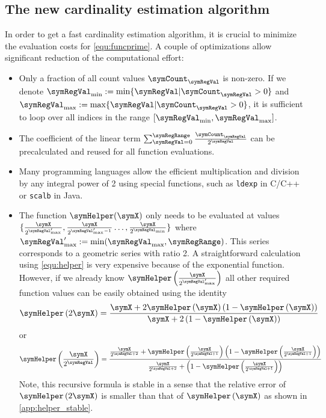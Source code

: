 \documentclass[11pt]{article} %
\begin{document}
\subsection{The new cardinality estimation algorithm}
In order to get a fast cardinality estimation algorithm, it is crucial to minimize the evaluation costs for \eqref{equ:funcprime}. A couple of optimizations allow significant reduction of the computational effort:
\begin{itemize}
\item Only a fraction of all count values $\symCount_\symRegVal$ is non-zero. If we denote $\symRegVal_\text{min}:=\min\lbrace \symRegVal\vert\symCount_\symRegVal>0\rbrace$ and $\symRegVal_\text{max}:=\max\lbrace \symRegVal\vert\symCount_\symRegVal>0\rbrace$,  it is sufficient to loop over all indices in the range $[\symRegVal_\text{min}, \symRegVal_\text{max}]$.
\item The coefficient of the linear term $\sum_{\symRegVal=0}^\symRegRange \frac{\symCount_\symRegVal}{2^\symRegVal}$ can be precalculated and reused for all function evaluations.
\item Many programming languages allow the efficient multiplication and division by any integral power of 2 using special functions, such as \texttt{ldexp} in C/C++ or \texttt{scalb} in Java.
\item The function $\symHelper(\symX)$ only needs to be evaluated at values $\lbrace\frac{\symX}{2^{\symRegVal'_\text{max}}},\frac{\symX}{2^{\symRegVal'_\text{max}-1}}\ldots,\frac{\symX}{2^{\symRegVal_\text{min}}}\rbrace$ where $\symRegVal'_\text{max} := \min(\symRegVal_\text{max}, \symRegRange)$. This series corresponds to a geometric series with ratio 2. A straightforward calculation using \eqref{equ:helper} is very expensive because of the exponential function. However, if we already know $\symHelper\left(\frac{\symX}{2^{\symRegVal'_\text{max}}}\right)$ all other required function values can be easily obtained using the identity
\begin{equation}
\label{equ:helper_recursion1}
\symHelper\left(2\symX\right) = \frac{\symX+2\symHelper\left(\symX\right)\left(1-\symHelper\left(\symX\right)\right)}{\symX+2\left(1-\symHelper\left(\symX\right)\right)}
\end{equation}
or
\begin{equation}
\label{equ:helper_recursion2}
\symHelper\left(\frac{\symX}{2^{\symRegVal}}\right) = \frac{\frac{\symX}{2^{\symRegVal+2}}+\symHelper\left(\frac{\symX}{2^{\symRegVal+1}}\right)\left(1-\symHelper\left(\frac{\symX}{2^{\symRegVal+1}}\right)\right)}{\frac{\symX}{2^{\symRegVal+2}}+\left(1-\symHelper\left(\frac{\symX}{2^{\symRegVal+1}}\right)\right)}
\end{equation}
Note, this recursive formula is stable in a sense that the relative error of $\symHelper\left(2\symX\right)$ is smaller than that of $\symHelper\left(\symX\right)$ as shown in \autoref{app:helper_stable}.


\end{itemize}
\end{document}
